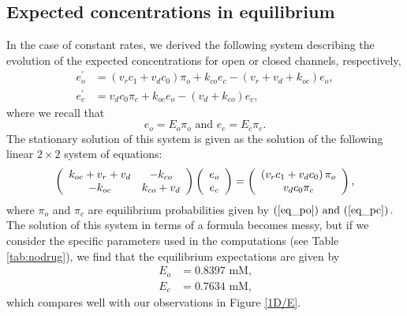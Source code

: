 


\bigskip

\subsection{Expected concentrations in equilibrium }
In the case of constant rates, 
we derived the following system describing the evolution of the expected
concentrations for open or closed channels, respectively,%
\begin{align}
e_{o}^{\prime}  & =\left(  v_{r}c_{1}+v_{d}c_{0}\right)  \pi_{o}+k_{co}%
e_{c}-\left(  v_{r}+v_{d}+k_{oc}\right)  e_{o}, \label{eo333}\\
e_{c}^{\prime}  & =v_{d}c_{0}\pi_{c}+k_{oc}e_{o}-\left(  v_{d}+k_{co}\right)
e_{c}, \label{ec333}
\end{align}
where we recall that
\begin{equation}
e_{o}=E_{o}\pi_{o}\text{ and }e_{c}=E_{c}\pi_{c}. \label{eoec_def2}
\end{equation}
The stationary solution of this system  is given as the solution of the
following linear $2\times2$ system of equations:%
\begin{equation}
\left(
\begin{array}
[c]{cc}%
k_{oc}+ v_{r}+v_{d}     & -k_{co}\\
-k_{oc} & k_{co}+v_{d}
\end{array}
\right)  \left(
\begin{array}
[c]{c}%
e_{o}\\
e_{c}%
\end{array}
\right)  =\left(
\begin{array}
[c]{c}%
\left(  v_{r}c_{1}+v_{d}c_{0}\right)  \pi_{o}\\
v_{d}c_{0}\pi_{c}%
\end{array}
\right)  ,\label{expectation100}%
\end{equation}
where  $\pi_{o}$ and $\pi_{c}$ are equilibrium probabilities given by $\left(
\ref{eq_po})\text{ and (}\ref{eq_pc}\right)  .$ The solution of this system
in terms of a formula becomes messy, but if we consider the specific
parameters used in the computations (see Table \ref{tab:nodrug}), 
we find that the equilibrium expectations are given by
\begin{align}
E_{o}  & =0.8397 \text{ mM,}\\
E_{c}  & =0.7634 \text{ mM,}
\end{align}
which compares well with our observations in Figure \ref{1D/E}.

